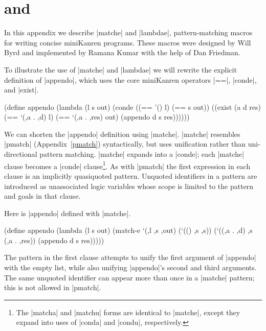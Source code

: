 \chapter{{\bf \matchesymbol} and {\bf \lambdaesymbol}}\label{matche}

In this appendix we describe \scheme|matche| and \scheme|lambdae|,
pattern-matching macros for writing concise miniKanren programs.
These macros were designed by Will Byrd and implemented by Ramana
Kumar with the help of Dan Friedman.

To illustrate the use of \scheme|matche| and \scheme|lambdae|
we will rewrite the explicit definition of \scheme|appendo|, which uses
the core miniKanren operators \scheme|==|, \scheme|conde|, and \scheme|exist|.

\schemedisplayspace
\begin{schemedisplay}
(define appendo
  (lambda (l s out)
    (conde
      ((== '() l) (== s out))
      ((exist (a d res)
         (== `(,a . ,d) l)
         (== `(,a . ,res) out)
         (appendo d s res))))))
\end{schemedisplay}

We can shorten the \scheme|appendo| definition using \scheme|matche|.
\scheme|matche| resembles \scheme|pmatch| (Appendix~\ref{pmatch})
syntactically, but uses unification rather than uni-directional
pattern matching.  \scheme|matche| expands into a \scheme|conde|;
each \scheme|matche| clause becomes a \scheme|conde|
clause\footnote{The \scheme|matcha| and \scheme|matchu| forms are
  identical to \scheme|matche|, except they expand into uses of
  \scheme|conda| and \scheme|condu|, respectively.}.  As with
\scheme|pmatch| the first expression in each clause is an implicitly
quasiquoted pattern.  Unquoted identifiers in a pattern are introduced
as unassociated logic variables whose scope is limited to the pattern
and goals in that clause.

Here is \scheme|appendo| defined with \scheme|matche|.

\schemedisplayspace
\begin{schemedisplay}
(define appendo
  (lambda (l s out)
    (match-e `(,l ,s ,out)
      (`(() ,s ,s))
      (`((,a . ,d) ,s (,a . ,res)) (appendo d s res)))))
\end{schemedisplay}

\noindent The pattern in the first clause attempts to unify the first
argument of \scheme|appendo| with the empty list, while also unifying
\scheme|appendo|'s second and third arguments.  The same unquoted
identifier can appear more than once in a \scheme|matche| pattern;
this is not allowed in \scheme|pmatch|.

